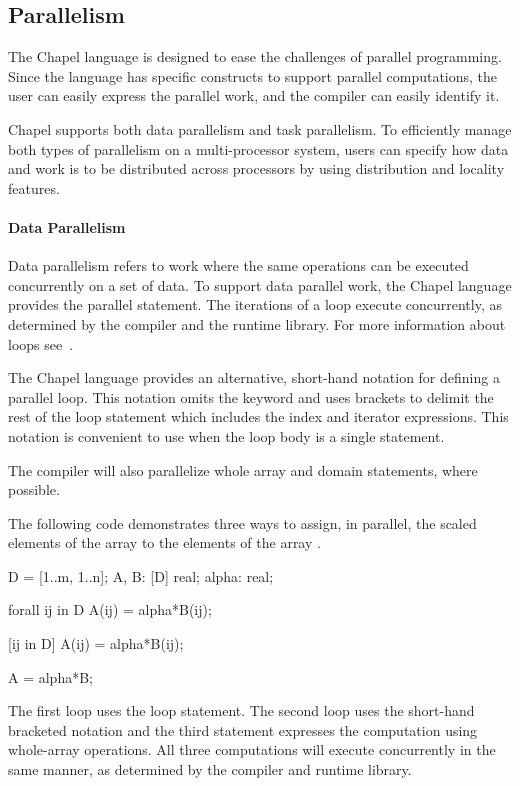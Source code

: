 \subsection{Parallelism}

The Chapel language is designed to ease the challenges of parallel
programming.  Since the language has specific constructs to support
parallel computations, the user can easily express the parallel work,
and the compiler can easily identify it.

Chapel supports both data parallelism and task parallelism.  To
efficiently manage both types of parallelism on a multi-processor
system, users can specify how data and work is to be distributed
across processors by using distribution and locality features.

\paragraph{Data Parallelism}
Data parallelism refers to work where the same operations can be
executed concurrently on a set of data.  To support data parallel
work, the Chapel language provides the parallel 
statement.  The iterations of a  loop execute
concurrently, as determined by the compiler and the runtime library.
For more information about  loops see~.

The Chapel language provides an alternative, short-hand notation for 
defining a parallel loop.  This notation omits the  keyword
and uses brackets to delimit the rest of the loop statement which includes
the index and iterator expressions.  This notation is convenient to use
when the loop body is a single statement.  

The compiler will also parallelize whole array and domain statements, 
where possible.

\begin{example}
The following code demonstrates three ways to assign, in parallel, 
the scaled elements of the array  to the elements of 
the array .  
\begin{chapel}  
D = [1..m, 1..n];
A, B: [D] real;
alpha: real;

forall ij in D {
  A(ij) = alpha*B(ij);
} 

[ij in D] A(ij) = alpha*B(ij);

A = alpha*B;
\end{chapel}
The first loop uses the  loop statement.  
The second loop uses the short-hand bracketed notation and the 
third statement expresses the computation using whole-array operations.  
All three computations will execute concurrently in the same manner,
as determined by the compiler and runtime library.
\end{example}


